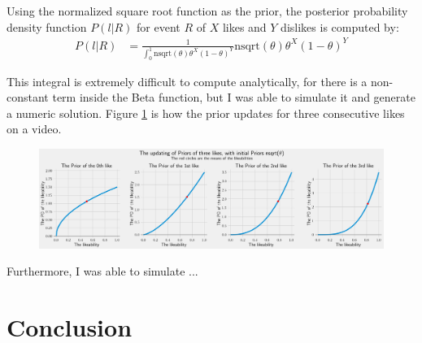 \documentclass[a4paper,11pt]{article}
\begin{document}
Using the normalized square root function as the prior, the posterior probability density function $P(l|R)$ for event $R$ of $X$ likes and $Y$ dislikes is computed by:
\begin{align*}
    P(l|R) &= \frac{1}{\int_0^1 \text{nsqrt}(\theta) \theta^X (1-\theta)^Y } \text{nsqrt}(\theta) \theta^X (1-\theta)^Y
\end{align*}

This integral is extremely difficult to compute analytically, for there is a non-constant term inside the Beta function, but I was able to simulate it and generate a numeric solution. Figure \ref{fig:up_nsqrt} is how the prior updates for three consecutive likes on a video.

\begin{figure}[H]
    \centering
    \includegraphics[width=\textwidth]{assets/nsqrt_updating_priors.png}
    \caption{}
    \label{fig:up_nsqrt}
\end{figure}

Furthermore, I was able to simulate ...


\section{Conclusion}


\end{document}
